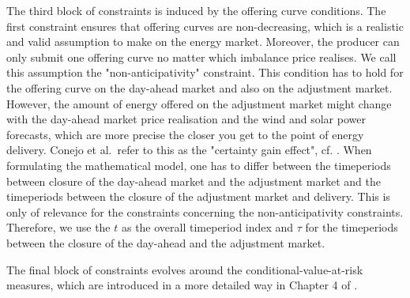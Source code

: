 The third block of constraints is induced by the offering curve conditions. The first constraint ensures that offering curves are non-decreasing, which is a realistic and valid assumption to make on the energy market. Moreover, the producer can only submit one offering curve no matter which imbalance price realises. We call this assumption the "non-anticipativity" constraint. This condition has to hold for the offering curve on the day-ahead market and also on the adjustment market. However, the amount of energy offered on the adjustment market might change with the day-ahead market price realisation and the wind and solar power forecasts, which are more precise the closer you get to the point of energy delivery. Conejo et al.\ refer to this as the "certainty gain effect", cf. \cite{Conejo10}. When formulating the mathematical model, one has to differ between the timeperiods between closure of the day-ahead market and the adjustment market and the timeperiods between the closure of the adjustment market and delivery. This is only of relevance for the constraints concerning the non-anticipativity constraints. Therefore, we use the $t$ as the overall timeperiod index and $\tau$ for the timeperiods between the closure of the day-ahead and the adjustment market.

The final block of constraints evolves around the conditional-value-at-risk measures, which are introduced in a more detailed way in Chapter 4 of \cite{Conejo10}.

